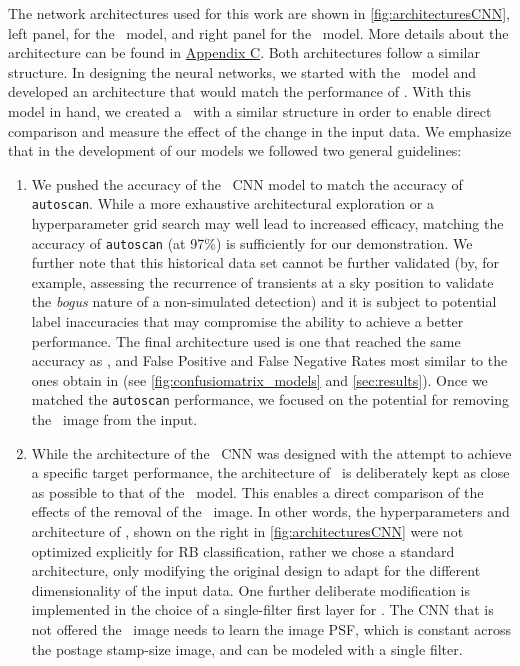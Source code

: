 The network architectures used for this work are shown in  \autoref{fig:architecturesCNN}, left panel, for the \diabased\ model, and right  panel for the \nodia\ model. More details about the architecture can be found in \hyperref[sec:appendixb]{Appendix C}. Both architectures follow a similar structure. In designing the neural networks, we started with the \diabased\ model and developed an architecture that would match the performance of \citet{Goldstein_2015}.  With this model in hand, we created a \nodia\ with a similar structure in order to enable direct comparison and measure the effect of the change in the input data. 
We emphasize that in the development of our models we followed two general guidelines: 
\begin{enumerate}
\item We pushed the accuracy of the  \diabased\ CNN model to match the accuracy of \texttt{autoscan}. While a more exhaustive architectural exploration or a hyperparameter grid search may well lead to increased efficacy, matching the accuracy of \texttt{autoscan} (at 97\%) is sufficiently for our demonstration. We further note that this historical data set cannot be further validated (by, for example, assessing the recurrence of transients at a sky position to validate the {\it bogus} nature of a non-simulated detection) and it is subject to potential label inaccuracies that may compromise the ability to achieve a better performance. The final architecture used is one that reached the same accuracy as \citet{Goldstein_2015}, and  False Positive and False Negative Rates most similar to the ones obtain in \citet{Goldstein_2015}  (see \autoref{fig:confusiomatrix_models} and \autoref{sec:results}). Once we matched the \texttt{autoscan} performance, we focused on the potential for removing the \diff\ image from the input.
\item While the architecture of the \diabased\ CNN was designed with the attempt to achieve a specific target performance, the architecture of \nodia\ is deliberately kept as close as possible to that of the \diabased\ model. This enables a direct comparison of the effects of the removal of the \diff\ image. 
In other words, the hyperparameters and architecture of \nodia, shown on the right in \autoref{fig:architecturesCNN} were not optimized explicitly for RB classification, rather we chose a standard architecture, only modifying the original design to adapt for the different dimensionality of the input data. One further deliberate modification is implemented in the choice of a single-filter first layer for \nodia. The CNN that is not offered the \diff\ image needs to learn the image PSF, which is constant across the postage stamp-size image, and can be modeled with a single filter. 
\end{enumerate}

